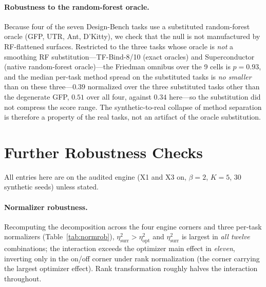\documentclass[letterpaper]{article}
\theoremstyle{plain}
\begin{document}
\paragraph{Robustness to the random-forest oracle.} Because four of the seven Design-Bench tasks use a substituted random-forest oracle (GFP, UTR, Ant, D'Kitty), we check that the null is not manufactured by RF-flattened surfaces. Restricted to the three tasks whose oracle is \emph{not} a smoothing RF substitution---TF-Bind-8/10 (exact oracles) and Superconductor (native random-forest oracle)---the Friedman omnibus over the 9 cells is $p{=}0.93$, and the median per-task method spread on the substituted tasks is \emph{no smaller} than on these three---$0.39$ normalized over the three substituted tasks other than the degenerate GFP, $0.51$ over all four, against $0.34$ here---so the substitution did not compress the score range. The synthetic-to-real collapse of method separation is therefore a property of the real tasks, not an artifact of the oracle substitution.

\section{Further Robustness Checks}
All entries here are on the audited engine (X1 and X3 on, $\beta{=}2$, $K{=}5$, 30 synthetic seeds) unless stated.

\paragraph{Normalizer robustness.} Recomputing the decomposition across the four engine corners and three per-task normalizers (Table~\ref{tab:normrob}), $\eta^2_{\text{surr}}>\eta^2_{\text{opt}}$ and $\eta^2_{\text{surr}}$ is largest in \emph{all twelve} combinations; the interaction exceeds the optimizer main effect in \emph{eleven}, inverting only in the on/off corner under rank normalization (the corner carrying the largest optimizer effect). Rank transformation roughly halves the interaction throughout.
\end{document}
